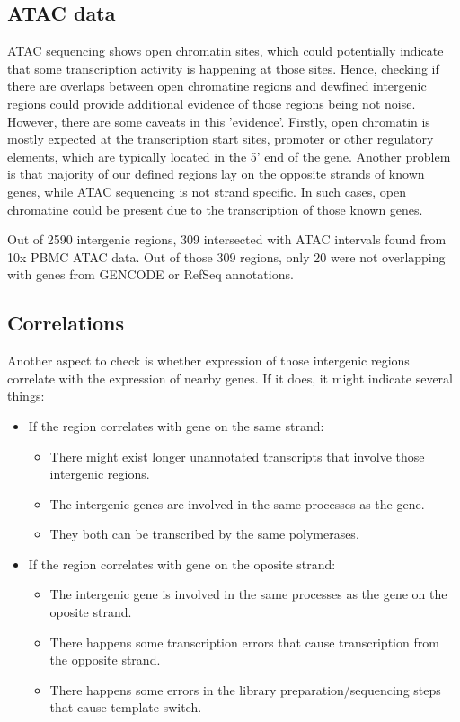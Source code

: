 \subsection{ATAC data}

ATAC sequencing shows open chromatin sites, which could potentially indicate that some transcription activity is happening at those sites.
Hence, checking if there are overlaps between open chromatine regions and dewfined intergenic regions could provide additional evidence of
those regions being not noise.
However, there are some caveats in this 'evidence'.
Firstly, open chromatin is mostly expected at the transcription start sites, promoter or other regulatory elements,
which are typically located in the 5' end of the gene.
Another problem is that majority of our defined regions lay on the opposite strands of known genes, while ATAC sequencing is not strand specific.
In such cases, open chromatine could be present due to the transcription of those known genes.

Out of 2590 intergenic regions, 309 intersected with ATAC intervals found from 10x PBMC ATAC data.
Out of those 309 regions, only 20 were not overlapping with genes from GENCODE or RefSeq annotations.

\subsection{Correlations}

Another aspect to check is whether expression of those intergenic regions correlate with the expression of nearby genes.
If it does, it might indicate several things:
\begin{itemize}
  \item If the region correlates with gene on the same strand:
  \begin{itemize}
    \item There might exist longer unannotated transcripts that involve those intergenic regions.
    \item The intergenic genes are involved in the same processes as the gene.
    \item They both can be transcribed by the same polymerases.
  \end{itemize}
  \item If the region correlates with gene on the oposite strand:
  \begin{itemize}
    \item The intergenic gene is involved in the same processes as the gene on the oposite strand.
    \item There happens some transcription errors that cause transcription from the opposite strand.
    \item There happens some errors in the library preparation/sequencing steps that cause template switch.
  \end{itemize}
\end{itemize}

